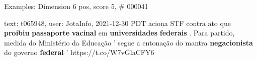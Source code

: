 \begin{frame}{Examples: Dimension 6 pos, score 5, \# 000041}
\footnotesize
\begin{exampleblock}{text: t065948, user: JotaInfo, 2021-12-30}
PDT aciona STF contra ato que \textbf{proibiu} \textbf{passaporte} 
\textbf{vacinal} em \textbf{universidades} \textbf{federais} . Para partido, 
medida do Ministério da Educação ' segue a entonação do mantra 
\textbf{negacionista} do governo \textbf{federal} ' https://t.co/W7vGlaCFY6 
\end{exampleblock}
\end{frame}
